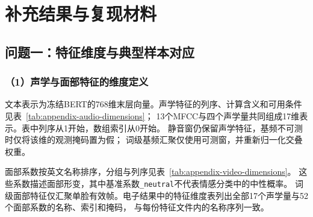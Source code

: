 \clearpage
\appendix
\renewcommand{\theHsection}{appendix.\Alph{section}}
\renewcommand{\thesubsection}{\Alph{section}.\arabic{subsection}}
\renewcommand{\thetable}{\Alph{section}.\arabic{table}}
\section{补充结果与复现材料}
\label{sec:appendix-reproduction}

\subsection{问题一：特征维度与典型样本对应}
\subsubsection*{（1）声学与面部特征的维度定义}
文本表示为冻结BERT的768维末层向量。声学特征的列序、计算含义和可用条件见表~\ref{tab:appendix-audio-dimensions}；
13个MFCC与四个声学量共同组成17维表示。表中列序从1开始，数组索引从0开始。
静音窗仍保留声学特征，基频不可测时仅将该维的观测掩码置为假；
词级基频汇聚仅使用可测窗，并重新归一化交叠权重。


面部系数按英文名称排序，分组与列序见表~\ref{tab:appendix-video-dimensions}。
这些系数描述面部形变，其中基准系数\texttt{\_neutral}不代表情感分类中的中性概率。
词级面部特征仅汇聚单脸有效帧。电子结果中的特征维度表列出全部17个声学量与52个面部系数的名称、索引和掩码，
与每份特征文件内的名称序列一致。

\FloatBarrier

